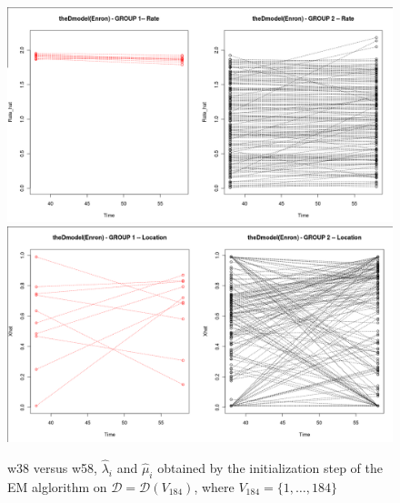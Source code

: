\documentclass[12pt]{article}%
\begin{document}
\begin{figure}
\begin{center}
{\includegraphics[scale=0.20]{v184_w38vsw58_Rate.png}}
{\includegraphics[scale=0.20]{v184_w38vsw58_Location.png}}
\end{center}
\caption{w38 versus w58, $\hat{\lambda}_i$ and $\hat{\mu}_i$ obtained by the initialization step of the EM alglorithm on $\mathcal D = \mathcal D(V_{184})$, where $V_{184} = \{1,\ldots, 184\}$}
\label{cepplot}
\end{figure}
\end{document}
